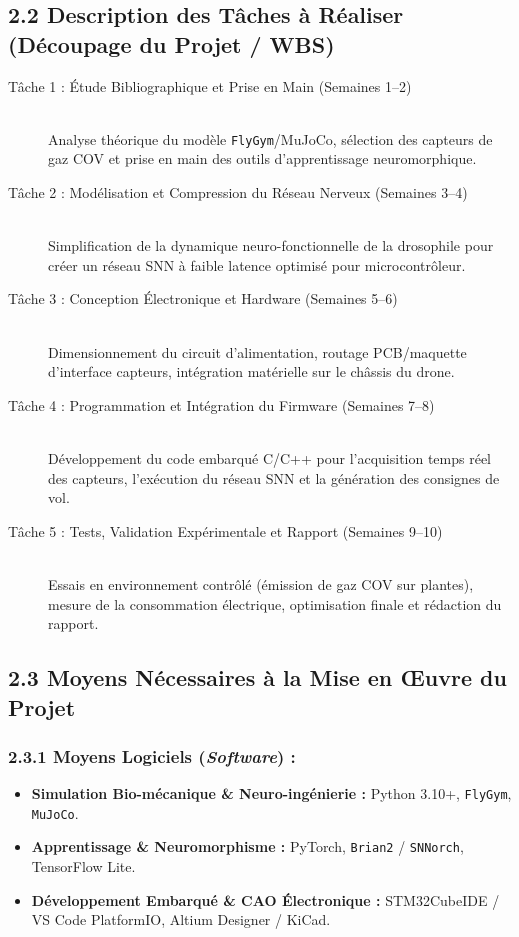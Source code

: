 \documentclass[11pt,a4paper]{article}
\begin{document}
\subsection*{\color{secondarygreen}2.2 Description des Tâches à Réaliser (Découpage du Projet / WBS)}

\begin{description}
    \item[Tâche 1 : Étude Bibliographique et Prise en Main (Semaines 1--2)] \hfill \\
    Analyse théorique du modèle \texttt{FlyGym}/MuJoCo, sélection des capteurs de gaz COV et prise en main des outils d'apprentissage neuromorphique.
    
    \item[Tâche 2 : Modélisation et Compression du Réseau Nerveux (Semaines 3--4)] \hfill \\
    Simplification de la dynamique neuro-fonctionnelle de la drosophile pour créer un réseau SNN à faible latence optimisé pour microcontrôleur.
    
    \item[Tâche 3 : Conception Électronique et Hardware (Semaines 5--6)] \hfill \\
    Dimensionnement du circuit d'alimentation, routage PCB/maquette d'interface capteurs, intégration matérielle sur le châssis du drone.
    
    \item[Tâche 4 : Programmation et Intégration du Firmware (Semaines 7--8)] \hfill \\
    Développement du code embarqué C/C++ pour l'acquisition temps réel des capteurs, l'exécution du réseau SNN et la génération des consignes de vol.
    
    \item[Tâche 5 : Tests, Validation Expérimentale et Rapport (Semaines 9--10)] \hfill \\
    Essais en environnement contrôlé (émission de gaz COV sur plantes), mesure de la consommation électrique, optimisation finale et rédaction du rapport.
\end{description}

\subsection*{\color{secondarygreen}2.3 Moyens Nécessaires à la Mise en Œuvre du Projet}

\subsubsection*{\color{darkgray}2.3.1 Moyens Logiciels (\textit{Software}) :}
\begin{itemize}
    \item \textbf{Simulation Bio-mécanique \& Neuro-ingénierie :} Python 3.10+, \texttt{FlyGym}, \texttt{MuJoCo}.
    \item \textbf{Apprentissage \& Neuromorphisme :} PyTorch, \texttt{Brian2} / \texttt{SNNorch}, TensorFlow Lite.
    \item \textbf{Développement Embarqué \& CAO Électronique :} STM32CubeIDE / VS Code PlatformIO, Altium Designer / KiCad.
\end{itemize}
\end{document}
